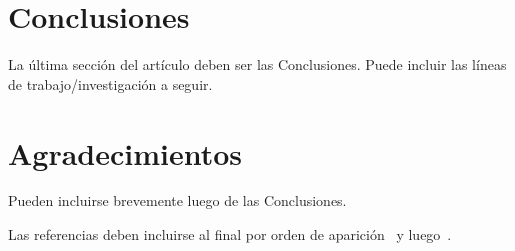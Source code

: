 \documentclass[a4paper,10pt]{article}
\begin{document}
\section{Conclusiones}

La última sección del artículo deben ser las Conclusiones. Puede incluir las líneas de trabajo/investigación a seguir.

\section{Agradecimientos}
Pueden incluirse brevemente luego de las Conclusiones.

Las referencias deben incluirse al final por orden de aparición~\cite{ref1} y luego~\cite{ref2}.

% 


\end{document}

